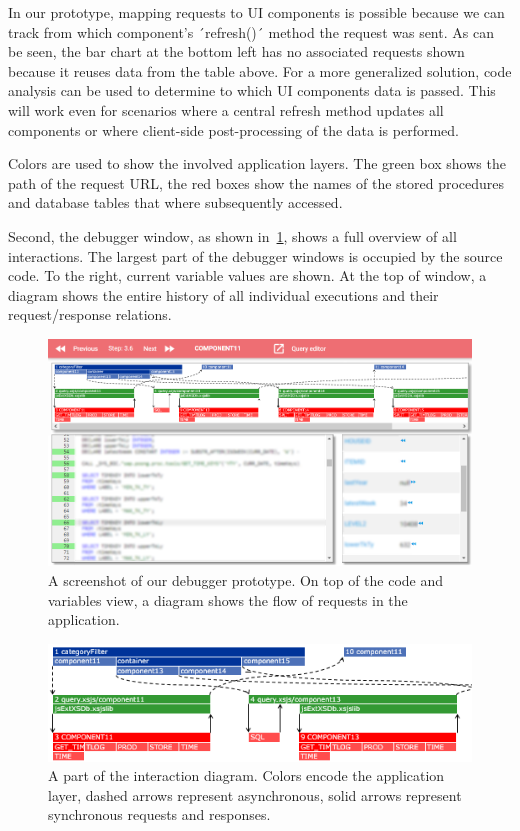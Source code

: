 In our prototype, mapping requests to UI components is possible because we can track from which component's ´refresh()´ method the request was sent.
As can be seen, the bar chart at the bottom left has no associated requests shown because it reuses data from the table above.
For a more generalized solution, code analysis can be used to determine to which UI components data is passed.
This will work even for scenarios where a central refresh method updates all components or where client-side post-processing of the data is performed.

Colors are used to show the involved application layers.
The green box shows the path of the request URL, the red boxes show the names of the stored procedures and database tables that where subsequently accessed.

Second, the debugger window, as shown in~\cref{fig:debugger}, shows a full overview of all interactions.
The largest part of the debugger windows is occupied by the source code.
To the right, current variable values are shown.
At the top of window, a diagram shows the entire history of all individual executions and their request/response relations.

\begin{figure}
	\centering
		\includegraphics[width=1.00\linewidth]{img/debugger_full.png}
	\caption{A screenshot of our debugger prototype. On top of the code and variables view, a diagram shows the flow of requests in the application.}
	\label{fig:debugger}
\end{figure}

\begin{figure}
	\centering
		\includegraphics[width=1.00\linewidth]{img/executions.png}
	\caption{A part of the interaction diagram. Colors encode the application layer, dashed arrows represent asynchronous, solid arrows represent synchronous requests and responses.}
	\label{fig:executions}
\end{figure}

